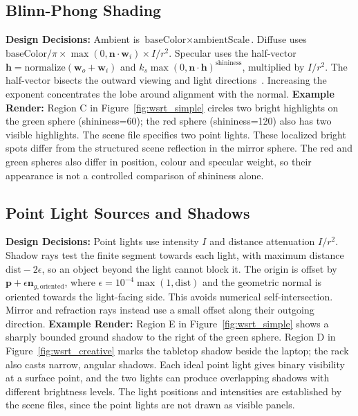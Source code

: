 \documentclass[11pt,a4paper]{article}
\begin{document}
\subsection{Blinn-Phong Shading}
\textbf{Design Decisions:} Ambient is \( \text{baseColor} \times \text{ambientScale} \). Diffuse uses \( \text{baseColor}/\pi \times \max(0, \mathbf{n}\cdot\mathbf{w}_i) \times I/r^2 \). Specular uses the half-vector \( \mathbf{h} = \text{normalize}(\mathbf{w}_o + \mathbf{w}_i) \) and \( k_s\max(0, \mathbf{n}\cdot\mathbf{h})^{\text{shininess}} \), multiplied by $I/r^2$. The half-vector bisects the outward viewing and light directions~\cite[Part~III, Sec.~3, p.~4]{cgr-notes}. Increasing the exponent concentrates the lobe around alignment with the normal.
\textbf{Example Render:}
Region C in Figure~\ref{fig:wsrt_simple} circles two bright highlights on the green sphere (shininess=60); the red sphere (shininess=120) also has two visible highlights. The scene file specifies two point lights. These localized bright spots differ from the structured scene reflection in the mirror sphere. The red and green spheres also differ in position, colour and specular weight, so their appearance is not a controlled comparison of shininess alone.

\subsection{Point Light Sources and Shadows}
\textbf{Design Decisions:} Point lights use intensity \( I \) and distance attenuation \( I/r^2 \). Shadow rays test the finite segment towards each light, with maximum distance \( \text{dist} - 2\epsilon \), so an object beyond the light cannot block it. The origin is offset by \(\mathbf{p}+\epsilon\mathbf{n}_{g,\mathrm{oriented}}\), where \(\epsilon=10^{-4}\max(1,\text{dist})\) and the geometric normal is oriented towards the light-facing side. This avoids numerical self-intersection. Mirror and refraction rays instead use a small offset along their outgoing direction.
\textbf{Example Render:}
Region E in Figure~\ref{fig:wsrt_simple} shows a sharply bounded ground shadow to the right of the green sphere. Region D in Figure~\ref{fig:wsrt_creative} marks the tabletop shadow beside the laptop; the rack also casts narrow, angular shadows. Each ideal point light gives binary visibility at a surface point, and the two lights can produce overlapping shadows with different brightness levels. The light positions and intensities are established by the scene files, since the point lights are not drawn as visible panels.
\end{document}
